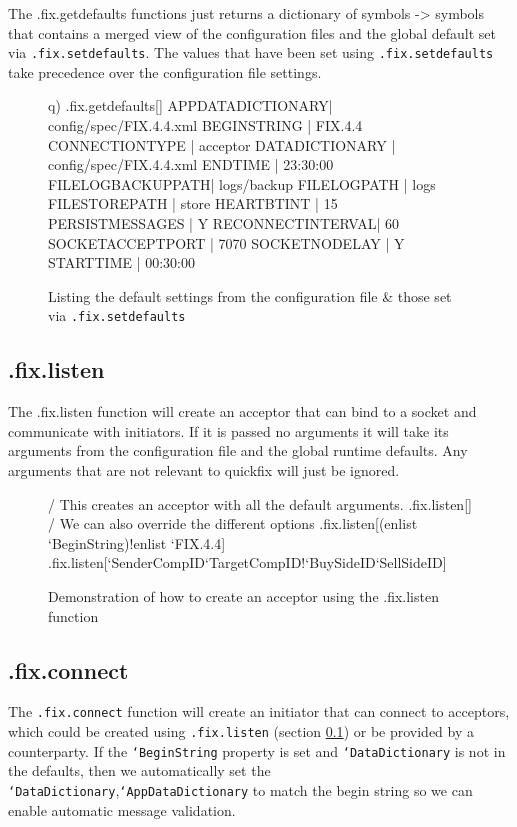 The .fix.getdefaults functions just returns a dictionary of symbols -> symbols that contains a merged view of the configuration files and the global default set via \texttt{.fix.setdefaults}. The values that have been set using \texttt{.fix.setdefaults} take precedence over the configuration file settings.

\begin{figure}[H]
\begin{qcode}
q) .fix.getdefaults[]
APPDATADICTIONARY| config/spec/FIX.4.4.xml
BEGINSTRING      | FIX.4.4
CONNECTIONTYPE   | acceptor
DATADICTIONARY   | config/spec/FIX.4.4.xml
ENDTIME          | 23:30:00
FILELOGBACKUPPATH| logs/backup
FILELOGPATH      | logs
FILESTOREPATH    | store
HEARTBTINT       | 15
PERSISTMESSAGES  | Y
RECONNECTINTERVAL| 60
SOCKETACCEPTPORT | 7070
SOCKETNODELAY    | Y
STARTTIME        | 00:30:00
\end{qcode}
\caption{Listing the default settings from the configuration file \& those set via \texttt{.fix.setdefaults}}
\end{figure}

\subsection{.fix.listen}
\label{func:listen}

The .fix.listen function will create an acceptor that can bind to a socket and communicate with initiators. If it is passed no arguments it will take its arguments from the configuration file
and the global runtime defaults. Any arguments that are not relevant to quickfix will just be
ignored.

\begin{figure}[H]
\begin{qcode}
/ This creates an acceptor with all the default arguments.
.fix.listen[] 
/ We can also override the different options 
.fix.listen[(enlist `BeginString)!enlist `FIX.4.4]
.fix.listen[`SenderCompID`TargetCompID!`BuySideID`SellSideID]
\end{qcode}
\caption{Demonstration of how to create an acceptor using the .fix.listen function}
\end{figure}

\subsection{.fix.connect}
\label{func:connect}

The \texttt{.fix.connect} function will create an initiator that can connect to acceptors, which could be created using \texttt{.fix.listen} (section \ref{func:listen}) or be provided by a counterparty. If the \texttt{`BeginString} property is set and \texttt{`DataDictionary}
is not in the defaults, then we automatically set the \texttt{`DataDictionary},\texttt{`AppDataDictionary} to match the begin string so we can enable automatic message validation.


